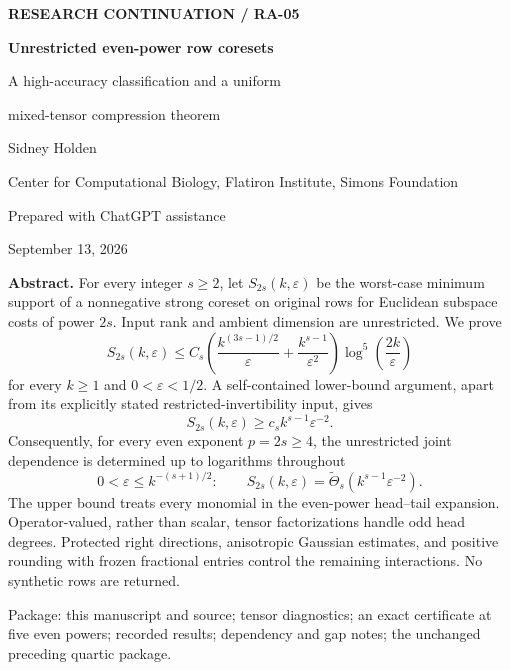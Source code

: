 \documentclass[11pt]{article}
\theoremstyle{remark}\newtheorem{remark}[theorem]{Remark}
\newcommand{\eps}{\varepsilon}\newcommand{\Sym}{\operatorname{Sym}}
\begin{document}
\begin{titlepage}
{\small\bfseries RESEARCH CONTINUATION / RA-05}\par\vspace{1.2cm}
{\huge\bfseries Unrestricted even-power row coresets}\par\vspace{.45cm}
{\Large A high-accuracy classification and a uniform\par mixed-tensor compression theorem}\par\vspace{.8cm}
Sidney Holden\par
{\small Center for Computational Biology, Flatiron Institute, Simons Foundation}\par
{\small Prepared with ChatGPT assistance}\par
September 13, 2026\par\vspace{.7cm}
\textbf{Abstract.} For every integer $s\ge2$, let $S_{2s}(k,\eps)$ be the worst-case minimum support of a nonnegative strong coreset on original rows for Euclidean subspace costs of power $2s$. Input rank and ambient dimension are unrestricted. We prove
\[
 S_{2s}(k,\eps)\le C_s\left(\frac{k^{(3s-1)/2}}{\eps}+\frac{k^{s-1}}{\eps^2}\right)
 \log^5\!\left(\frac{2k}{\eps}\right)
\]
for every $k\ge1$ and $0<\eps<1/2$. A self-contained lower-bound argument, apart from its explicitly stated restricted-invertibility input, gives
\[
 S_{2s}(k,\eps)\ge c_s k^{s-1}\eps^{-2}.
\]
Consequently, for every even exponent $p=2s\ge4$, the unrestricted joint dependence is determined up to logarithms throughout
\[
 0<\eps\le k^{-(s+1)/2}:\qquad
 S_{2s}(k,\eps)=\widetilde\Theta_s(k^{s-1}\eps^{-2}).
\]
The upper bound treats every monomial in the even-power head--tail expansion. Operator-valued, rather than scalar, tensor factorizations handle odd head degrees. Protected right directions, anisotropic Gaussian estimates, and positive rounding with frozen fractional entries control the remaining interactions. No synthetic rows are returned.

\vspace{.3cm}
\vfill
{\small Package: this manuscript and source; tensor diagnostics; an exact certificate at five even powers; recorded results; dependency and gap notes; the unchanged preceding quartic package.}
\end{titlepage}
{\small\setlength{\parskip}{0pt}\tableofcontents}\newpage
\end{document}
